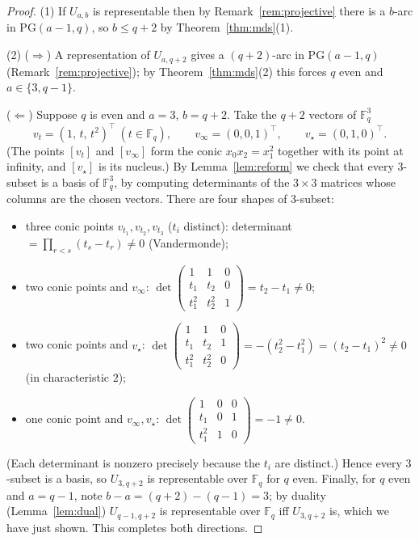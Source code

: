 \documentclass{amsart}
\theoremstyle{definition}
\begin{document}
\begin{proof}
(1) If $U_{a,b}$ is representable then by Remark~\ref{rem:projective} there is a
$b$-arc in $\mathrm{PG}(a-1,q)$, so $b\le q+2$ by Theorem~\ref{thm:mds}(1).

(2) ($\Rightarrow$) A representation of $U_{a,q+2}$ gives a $(q+2)$-arc in
$\mathrm{PG}(a-1,q)$ (Remark~\ref{rem:projective}); by Theorem~\ref{thm:mds}(2)
this forces $q$ even and $a\in\{3,q-1\}$.

($\Leftarrow$) Suppose $q$ is even and $a=3$, $b=q+2$. Take the $q+2$ vectors of
$\mathbb F_q^3$
\[
v_t=(1,\,t,\,t^2)^{\top}\ (t\in\mathbb F_q),\qquad
v_\infty=(0,0,1)^{\top},\qquad
v_\star=(0,1,0)^{\top}.
\]
(The points $[v_t]$ and $[v_\infty]$ form the conic
$x_0x_2=x_1^2$ together with its point at infinity, and $[v_\star]$ is its
nucleus.) By Lemma~\ref{lem:reform} we check that every $3$-subset is a basis of
$\mathbb F_q^3$, by computing determinants of the $3\times3$ matrices whose columns
are the chosen vectors. There are four shapes of $3$-subset:
\begin{itemize}
\item three conic points $v_{t_1},v_{t_2},v_{t_3}$ ($t_i$ distinct):
determinant $=\prod_{r<s}(t_s-t_r)\ne0$ (Vandermonde);
\item two conic points and $v_\infty$: $\det\!\begin{pmatrix}1&1&0\\
t_1&t_2&0\\ t_1^2&t_2^2&1\end{pmatrix}=t_2-t_1\ne0$;
\item two conic points and $v_\star$: $\det\!\begin{pmatrix}1&1&0\\
t_1&t_2&1\\ t_1^2&t_2^2&0\end{pmatrix}=-(t_2^2-t_1^2)=(t_2-t_1)^2\ne0$ (in
characteristic $2$);
\item one conic point and $v_\infty,v_\star$: $\det\!\begin{pmatrix}1&0&0\\
t_1&0&1\\ t_1^2&1&0\end{pmatrix}=-1\ne0$.
\end{itemize}
(Each determinant is nonzero precisely because the $t_i$ are distinct.) Hence
every $3$-subset is a basis, so $U_{3,q+2}$ is representable over $\mathbb F_q$
for $q$ even. Finally, for $q$ even and $a=q-1$, note $b-a=(q+2)-(q-1)=3$; by
duality (Lemma~\ref{lem:dual}) $U_{q-1,q+2}$ is representable over $\mathbb F_q$
iff $U_{3,q+2}$ is, which we have just shown. This completes both directions.
\end{proof}
\end{document}
